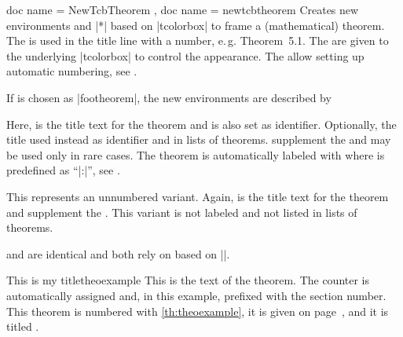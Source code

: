 \begin{docCommands}[
    doc parameter = \oarg{init options}\marg{name}\marg{display name}\marg{options}\marg{prefix},
    doc updated=2022-07-18
    ]
    {
      { doc name = NewTcbTheorem },
      { doc name = newtcbtheorem }
    }
  Creates new environments  and |*| based on |tcolorbox| to frame a
  (mathematical) theorem. The  is used in the title line
  with a number, e.\,g. \mbox{\flqq Theorem 5.1\frqq}.
  The  are given to the underlying |tcolorbox| to control
  the appearance.
  The  allow setting up automatic numbering,
  see .\par\medskip

  If  is chosen as |footheorem|, the new environments are described by
  \begin{docEnvironments}[
      doc no index,
      doc name = footheorem,
      doc parameter = \oarg{keys}\oarg{short}\marg{title}\marg{marker}
    ]{}
    Here,  is the title text for the theorem and
    is also set as  identifier.
    Optionally, the  title used instead as  identifier
    and in lists of theorems.
     supplement the  and may be
    used only in rare cases. The theorem is
    automatically labeled with 
    where  is predefined as \enquote{|:|}, see .
  \end{docEnvironments}
  \begin{docEnvironments}[
      doc no index,
      doc name = footheorem*,
      doc parameter = \oarg{keys}\marg{title}
    ]{}
    This represents an unnumbered variant. Again,  is the title text for the theorem
    and  supplement the .
    This variant is not labeled and not listed in lists of theorems.
  \end{docEnvironments}

  \begin{marker}
   and  are identical and both
  rely on  based on |\NewDocumentCommand|.
  \end{marker}
\clearpage


\begin{dispExample}
\begin{mytheo}{This is my title}{theoexample}
  This is the text of the theorem. The counter is automatically assigned and,
  in this example, prefixed with the section number. This theorem is numbered with
  \ref{th:theoexample}, it is given on page~\pageref{th:theoexample},
  and it is titled \flqq{}\frqq.
\end{mytheo}
\end{dispExample}



\end{docCommands}
